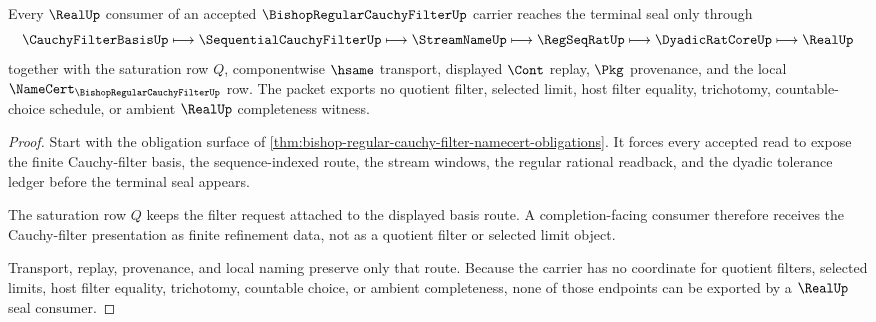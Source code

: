 \begin{theorem}
\label{thm:bishop-regular-cauchy-filter-real-seal-nonescape}
Every $\RealUp$ consumer of an accepted $\BishopRegularCauchyFilterUp$ carrier reaches the terminal seal only through
$$
\CauchyFilterBasisUp \longmapsto \SequentialCauchyFilterUp \longmapsto \StreamNameUp \longmapsto \RegSeqRatUp \longmapsto \DyadicRatCoreUp \longmapsto \RealUp
$$
together with the saturation row $Q$, componentwise $\hsame$ transport, displayed $\Cont$ replay, $\Pkg$ provenance, and the local $\NameCert_{\BishopRegularCauchyFilterUp}$ row. The packet exports no quotient filter, selected limit, host filter equality, trichotomy, countable-choice schedule, or ambient $\RealUp$ completeness witness.
\end{theorem}
\begin{proof}
Start with the obligation surface of \autoref{thm:bishop-regular-cauchy-filter-namecert-obligations}. It forces every accepted read to expose the finite Cauchy-filter basis, the sequence-indexed route, the stream windows, the regular rational readback, and the dyadic tolerance ledger before the terminal seal appears.

The saturation row $Q$ keeps the filter request attached to the displayed basis route. A completion-facing consumer therefore receives the Cauchy-filter presentation as finite refinement data, not as a quotient filter or selected limit object.

Transport, replay, provenance, and local naming preserve only that route. Because the carrier has no coordinate for quotient filters, selected limits, host filter equality, trichotomy, countable choice, or ambient completeness, none of those endpoints can be exported by a $\RealUp$ seal consumer.
\end{proof}



